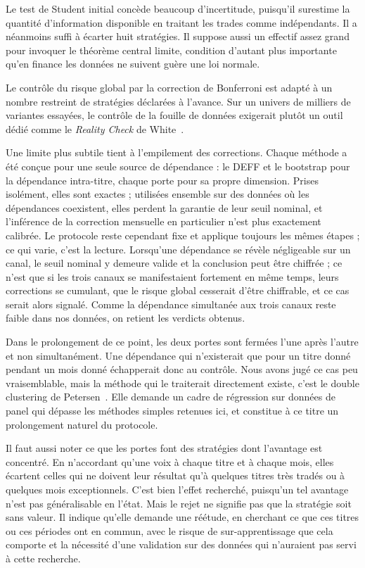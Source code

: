 Le test de Student initial concède beaucoup d'incertitude, puisqu'il surestime
la quantité d'information disponible en traitant les trades comme indépendants.
Il a néanmoins suffi à écarter huit stratégies. Il suppose aussi un effectif
assez grand pour invoquer le théorème central limite, condition d'autant plus
importante qu'en finance les données ne suivent guère une loi normale.

Le contrôle du risque global par la correction de Bonferroni est adapté à un
nombre restreint de stratégies déclarées à l'avance. Sur un univers de milliers
de variantes essayées, le contrôle de la fouille de données exigerait plutôt un
outil dédié comme le \emph{Reality Check} de White~\cite{white2000}.

Une limite plus subtile tient à l'empilement des corrections. Chaque méthode a
été conçue pour une seule source de dépendance : le DEFF et le bootstrap pour
la dépendance intra-titre, chaque porte pour sa propre dimension. Prises
isolément, elles sont exactes ; utilisées ensemble sur des données où les
dépendances coexistent, elles perdent la garantie de leur seuil nominal, et
l'inférence de la correction mensuelle en particulier n'est plus exactement
calibrée. Le protocole reste cependant fixe et applique toujours les mêmes
étapes ; ce qui varie, c'est la lecture. Lorsqu'une dépendance se révèle
négligeable sur un canal, le seuil nominal y demeure valide et la conclusion
peut être chiffrée ; ce n'est que si les trois canaux se manifestaient
fortement en même temps, leurs corrections se cumulant, que le risque global
cesserait d'être chiffrable, et ce cas serait alors signalé. Comme la
dépendance simultanée aux trois canaux reste faible dans nos données, on
retient les verdicts obtenus.

Dans le prolongement de ce point, les deux portes sont fermées l'une après
l'autre et non simultanément. Une dépendance qui n'existerait que pour un
titre donné pendant un mois donné échapperait donc au contrôle. Nous avons
jugé ce cas peu vraisemblable, mais la méthode qui le traiterait directement
existe, c'est le double clustering de Petersen~\cite{petersen2009}. Elle
demande un cadre de régression sur données de panel qui dépasse les méthodes
simples retenues ici, et constitue à ce titre un prolongement naturel du
protocole.

Il faut aussi noter ce que les portes font des stratégies dont l'avantage est
concentré. En n'accordant qu'une voix à chaque titre et à chaque mois, elles
écartent celles qui ne doivent leur résultat qu'à quelques titres très tradés
ou à quelques mois exceptionnels. C'est bien l'effet recherché, puisqu'un tel
avantage n'est pas généralisable en l'état. Mais le rejet ne signifie pas que
la stratégie soit sans valeur. Il indique qu'elle demande une réétude, en
cherchant ce que ces titres ou ces périodes ont en commun, avec le risque de
sur-apprentissage que cela comporte et la nécessité d'une validation sur des
données qui n'auraient pas servi à cette recherche.

